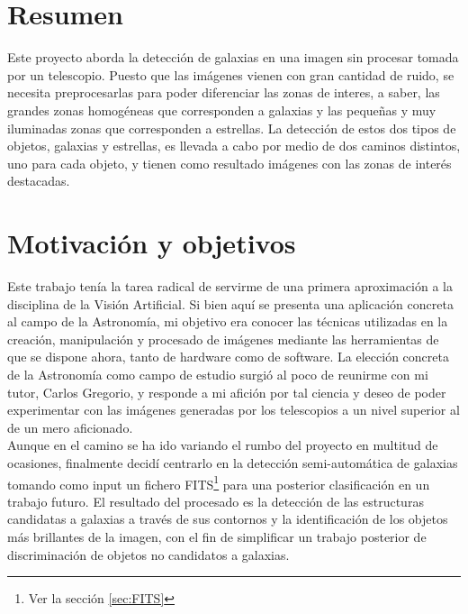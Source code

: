 \documentclass[a4paper,12pt]{article}
\begin{document}
\section*{Resumen}
Este proyecto aborda la detección de galaxias en una imagen sin procesar tomada por un telescopio. Puesto que las imágenes vienen con gran cantidad de ruido, se necesita preprocesarlas para poder diferenciar las zonas de interes, a saber, las grandes zonas homogéneas que corresponden a galaxias y las pequeñas y muy iluminadas zonas que corresponden a estrellas. La detección de estos dos tipos de objetos, galaxias y estrellas, es llevada a cabo por medio de dos caminos distintos, uno para cada objeto, y tienen como resultado imágenes con las zonas de interés destacadas.
\newpage
\renewcommand\contentsname{Índice general}
\tableofcontents
\newpage
\section{Motivación y objetivos}
Este trabajo tenía la tarea radical de servirme de una primera aproximación a la disciplina de la Visión Artificial. Si bien aquí se presenta una aplicación concreta al campo de la Astronomía, mi objetivo era conocer las técnicas utilizadas en la creación, manipulación y procesado de imágenes mediante las herramientas de que se dispone ahora, tanto de hardware como de software. La elección concreta de la Astronomía como campo de estudio surgió al poco de reunirme con mi tutor, Carlos Gregorio, y responde a mi afición por tal ciencia y deseo de poder experimentar con las imágenes generadas por los telescopios a un nivel superior al de un mero aficionado.
\\
Aunque en el camino se ha ido variando el rumbo del proyecto en multitud de ocasiones, finalmente decidí centrarlo en la detección semi-automática de galaxias tomando como input un fichero FITS\footnote{Ver la sección \ref{sec:FITS}} para una posterior clasificación en un trabajo futuro. El resultado del procesado es la detección de las estructuras candidatas a galaxias a través de sus contornos y la identificación de los objetos más brillantes de la imagen, con el fin de simplificar un trabajo posterior de discriminación de objetos no candidatos a galaxias.
\end{document}
